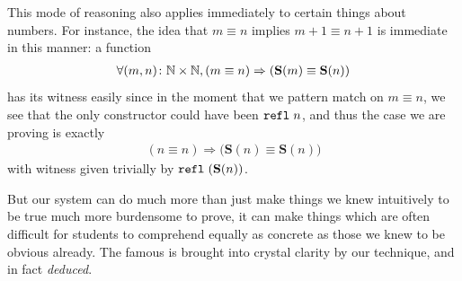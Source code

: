\documentclass[11pt]{article}
\begin{document}
This mode of reasoning also applies immediately to certain things about numbers. For instance, the idea that $m \equiv n$ implies $m + 1 \equiv n + 1$ is immediate in this manner: a function \begin{gather*}
\forall (m, n) \colon \mathbb{N} \times \mathbb{N}, (m \equiv n) \Rightarrow (\mathbf{S}(m) \equiv \mathbf{S}(n))
\end{gather*}
has its witness easily since in the moment that we pattern match on $m \equiv n$, we see that the only constructor could have been $\mathtt{refl} \hspace{0.3em} n$, and thus the case we are proving is exactly \begin{gather*}
(n \equiv n) \Rightarrow \big(\mathbf{S}(n) \equiv \mathbf{S}(n) \big)
\end{gather*}
with witness given trivially by $\mathtt{refl} \hspace{0.3em} (\mathbf{S}(n))$.

But our system can do much more than just make things we knew intuitively to be true much more burdensome to prove, it can make things which are often difficult for students to comprehend equally as concrete as those we knew to be obvious already. The famous  is brought into crystal clarity by our technique, and in fact \emph{deduced}.

\end{document}
